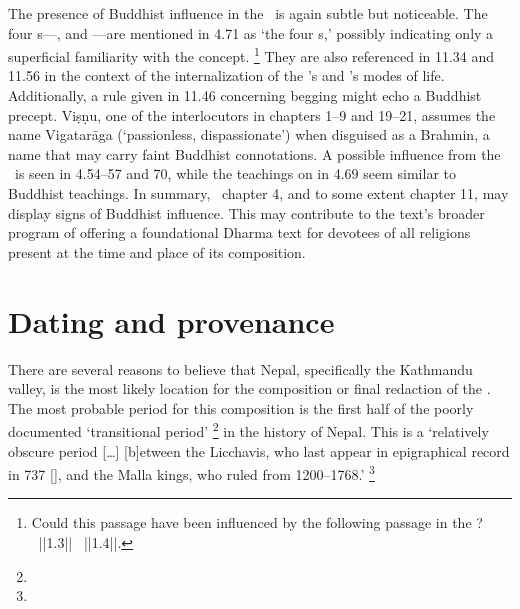 The presence of Buddhist influence in the \VSS\ is again subtle but noticeable. 
The four s---,
and ---are mentioned in 4.71 as `the four s,' 
possibly indicating only a superficial familiarity with the concept.%
	\footnote{Could this passage have been influenced by 
                the following passage in the \Dharmasamuccaya?		
                                \nocite{CaubeDharmasamuccaya}
				~||1.3||
			  ~||1.4||.}
They are also referenced in 11.34 and 11.56 in the context of the
internalization of the 's and 's modes of
life. Additionally, a rule given in 11.46 concerning begging might echo a
Buddhist precept. Viṣṇu, one of the interlocutors in chapters 1--9 and 19--21,
assumes the name Vigatarāga (`passionless, dispassionate') when disguised as a
Brahmin, a name that may carry faint Buddhist connotations. A possible
influence from the \Buddhacarita\ is seen in 4.54--57 and 70, while the
teachings on  in 4.69 seem similar to Buddhist teachings. 
In summary, \VSS\ chapter 4, and to some extent chapter 11, may display signs of
Buddhist influence. This may contribute to the text's broader program of
offering a foundational Dharma text for devotees of all religions present at
the time and place of its composition.






\section{Dating and provenance}
\label{provenance}
There are several reasons to believe that
Nepal, specifically the Kathmandu valley, is the most
likely location for the composition or final redaction of the \VSS. 
The most probable period for this composition is 
the first half of the poorly documented `transitional period'%
	\footnote{}
in the history of Nepal. 
This is a `relatively obscure period [\dots]
[b]etween the Licchavis, who last appear 
in epigraphical record in 737 [\CE], 
and the Malla kings, who ruled from 1200--1768.'%
	\footnote{}

